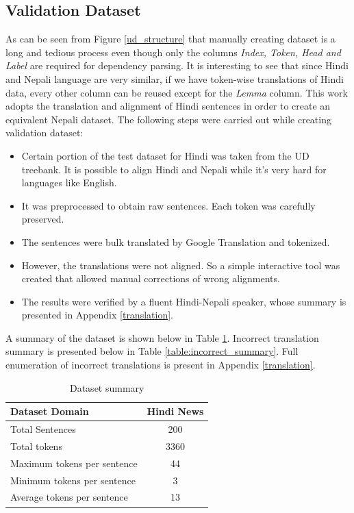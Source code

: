 \subsection{Validation Dataset}
As can be seen from Figure \ref{ud_structure} that manually creating dataset is
a long and tedious process even though only the columns \textit{Index, Token,
Head and Label} are required for dependency parsing. It is interesting to see
that since Hindi and Nepali language are very similar, if we have token-wise
translations of Hindi data, every other column can be reused except for the
\textit{Lemma} column. This work adopts the translation and alignment of Hindi
sentences in order to create an equivalent Nepali dataset. The following steps
were carried out while creating validation dataset:
\begin{itemize}
    \item[1.] Certain portion of the test dataset for Hindi was taken from the UD treebank. It is possible to align Hindi and Nepali while it's very hard for languages like English.
    \item[2.] It was preprocessed to obtain raw sentences. Each token was carefully preserved.
    \item[3.] The sentences were bulk translated by Google Translation and tokenized.
    \item[4.] However, the translations were not aligned. So a simple interactive tool was created that allowed manual corrections of wrong alignments.
    \item[5.] The results were verified by a fluent Hindi-Nepali speaker, whose summary is presented in Appendix \ref{translation}.
\end{itemize}
A summary of the dataset is shown below in Table \ref{table:dataset_summary}.
Incorrect translation summary is presented below in Table \ref{table:incorrect_summary}. Full enumeration of incorrect
translations is present in Appendix \ref{translation}.

\begin{table}[ht]
    \begin{center}
        \begin{tabular}{|l|c|}
            \hline
            Dataset Domain & Hindi News \\
            \hline
            Total Sentences & 200 \\
            \hline
            Total tokens & 3360 \\
            \hline
            Maximum tokens per sentence & 44 \\
            \hline
            Minimum tokens per sentence & 3 \\
            \hline
            Average tokens per sentence & 13 \\
            \hline
        \end{tabular}
        \caption{Dataset summary}
        \label{table:dataset_summary}
    \end{center}
\end{table}


